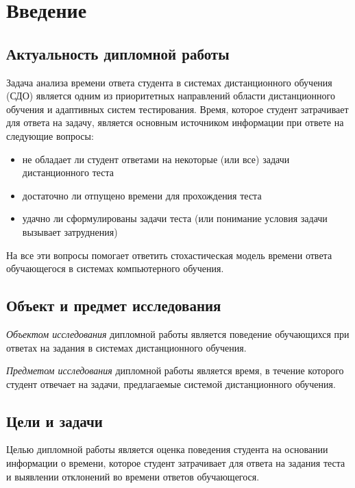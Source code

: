 \chapter{Введение}

\label{intr}
\section{Актуальность дипломной работы}
Задача анализа времени ответа студента в системах дистанционного обу\-чения (СДО) является одним из приоритетных направлений области дистан\-ционного обучения и адаптивных систем тестирования. 
Время, которое студент затрачивает для ответа на задачу, является основным источником информации при ответе на следующие вопросы:
\begin{itemize}
\item не обладает ли студент ответами на некоторые (или все) задачи дистанци\-онного теста
\item достаточно ли отпущено времени для прохождения теста
\item удачно ли сформулированы задачи теста (или понимание условия задачи вызывает затруднения)
\end{itemize}

На все эти вопросы помогает ответить стохастическая модель времени ответа обучающегося в системах компьютерного обучения.

\section{Объект и предмет исследования}
{\itshape Объектом исследования} дипломной работы является поведение обуча\-ющихся при ответах на задания в системах дистанционного обучения. 

{\itshape Предметом исследования} дипломной работы является время, в течение которого студент отвечает на задачи, предлагаемые системой дистанционного обучения. 

\section{Цели и задачи}

Целью дипломной работы является оценка поведения студента на осно\-вании информа\-ции о времени, которое студент затрачивает для ответа на задания теста и выявлении отклонений во времени ответов обучающегося.


